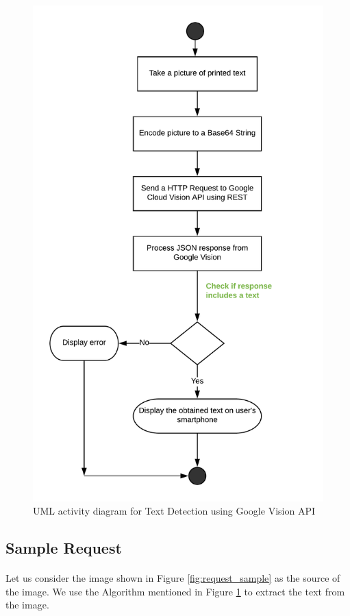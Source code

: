 \documentclass[12pt]{article}
\begin{document}
\begin{figure}[H]
	\centering
	\includegraphics[width=0.75\linewidth]{media/VISION_API.png}
	\caption{UML activity diagram for Text Detection using Google Vision API}
	\label{fig:vision}
\end{figure} 

\subsection{Sample Request}

\paragraph{}Let us consider the image shown in Figure \ref{fig:request_sample} as the source of the image. We use the Algorithm mentioned in Figure \ref{fig:vision} to extract the text from the image.
\end{document}
